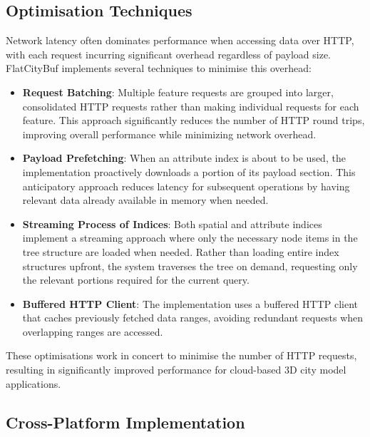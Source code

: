 \subsection{Optimisation Techniques}
\label{methodology:http_range_requests:range_request_optimisations}

Network latency often dominates performance when accessing data over HTTP, with each request incurring significant overhead regardless of payload size. FlatCityBuf implements several techniques to minimise this overhead:

\begin{itemize}
  \item \textbf{Request Batching}: Multiple feature requests are grouped into larger, consolidated HTTP requests rather than making individual requests for each feature. This approach significantly reduces the number of HTTP round trips, improving overall performance while minimizing network overhead.

  \item \textbf{Payload Prefetching}: When an attribute index is about to be used, the implementation proactively downloads a portion of its payload section. This anticipatory approach reduces latency for subsequent operations by having relevant data already available in memory when needed.

  \item \textbf{Streaming Process of Indices}: Both spatial and attribute indices implement a streaming approach where only the necessary node items in the tree structure are loaded when needed. Rather than loading entire index structures upfront, the system traverses the tree on demand, requesting only the relevant portions required for the current query.

  \item \textbf{Buffered HTTP Client}: The implementation uses a buffered HTTP client that caches previously fetched data ranges, avoiding redundant requests when overlapping ranges are accessed.

\end{itemize}

These optimisations work in concert to minimise the number of HTTP requests, resulting in significantly improved performance for cloud-based 3D city model applications.

\subsection{Cross-Platform Implementation}
\label{methodology:http_range_requests:cross_platform_implementation}

